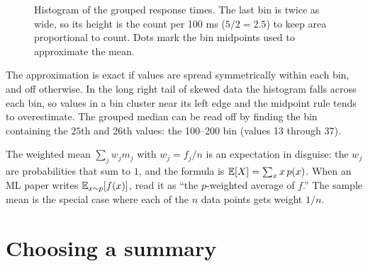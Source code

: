\begin{figure}[H]
\centering
{}
\caption{Histogram of the grouped response times. The last bin is twice as wide,
so its height is the count per 100 ms ($5/2 = 2.5$) to keep area proportional to
count. Dots mark the bin midpoints used to approximate the mean.}
\label{fig:center-spread-grouped}
\end{figure}

The approximation is exact if values are spread symmetrically within each bin, and
off otherwise. In the long right tail of skewed data the histogram falls across each
bin, so values in a bin cluster near its left edge and the midpoint rule tends to
overestimate. The grouped median can be read off by
finding the bin containing the $25$th and $26$th values: the 100--200 bin (values 13
through 37).

\begin{connectionbox}
The weighted mean $\sum_j w_j m_j$ with $w_j = f_j / n$ is an expectation in
disguise: the $w_j$ are probabilities that sum to $1$, and the formula is
$\operatorname{\mathbb{E}}[X] = \sum_x x\, p(x)$. When an ML paper writes $\operatorname{\mathbb{E}}_{x\sim p}[f(x)]$, read it as
``the $p$-weighted average of $f$.'' The sample mean is the special case where each
of the $n$ data points gets weight $1/n$.
\end{connectionbox}

\section{Choosing a summary}
\label{sec:center-spread-choosing}

